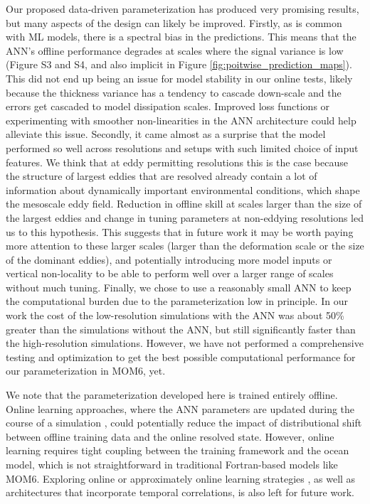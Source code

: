 \documentclass[draft]{agujournal2019}
\begin{document}
Our proposed data-driven parameterization has produced very promising results, but many aspects of the design can likely be improved. Firstly, as is common with ML models, there is a spectral bias in the predictions. This means that the ANN's offline performance degrades at scales where the signal variance is low (Figure S3 and S4, and also implicit in Figure \ref{fig:poitwise_prediction_maps}). This did not end up being an issue for model stability in our online tests, likely because the thickness variance has a tendency to cascade down-scale and the errors get cascaded to model dissipation scales. Improved loss functions or experimenting with smoother non-linearities in the ANN architecture could help alleviate this issue. Secondly, it came almost as a surprise that the model performed so well across resolutions and setups with such limited choice of input features. We think that at eddy permitting resolutions this is the case because the structure of largest eddies that are resolved already contain a lot of information about dynamically important environmental conditions, which shape the mesoscale eddy field. Reduction in offline skill at scales larger than the size of the largest eddies and change in tuning parameters at non-eddying resolutions led us to this hypothesis. This suggests that in future work it may be worth paying more attention to these larger scales (larger than the deformation scale or the size of the dominant eddies), and potentially introducing more model inputs or vertical non-locality to be able to perform well over a larger range of scales without much tuning. Finally, we chose to use a reasonably small ANN to keep the computational burden due to the parameterization low in principle. In our work the cost of the low-resolution simulations with the ANN was about 50\% greater than the simulations without the ANN, but still significantly faster than the high-resolution simulations. However, we have not performed a comprehensive testing and optimization to get the best possible computational performance for our parameterization in MOM6, yet.  

We note that the parameterization developed here is trained entirely offline. Online learning approaches, where the ANN parameters are updated during the course of a simulation \cite{yan2025adjoint, maddison2026online}, could potentially reduce the impact of distributional shift between offline training data and the online resolved state. However, online learning requires tight coupling between the training framework and the ocean model, which is not straightforward in traditional Fortran-based models like MOM6. Exploring online or approximately online learning strategies \cite{ouala2024online}, as well as architectures that incorporate temporal correlations, is also left for future work.
\end{document}
